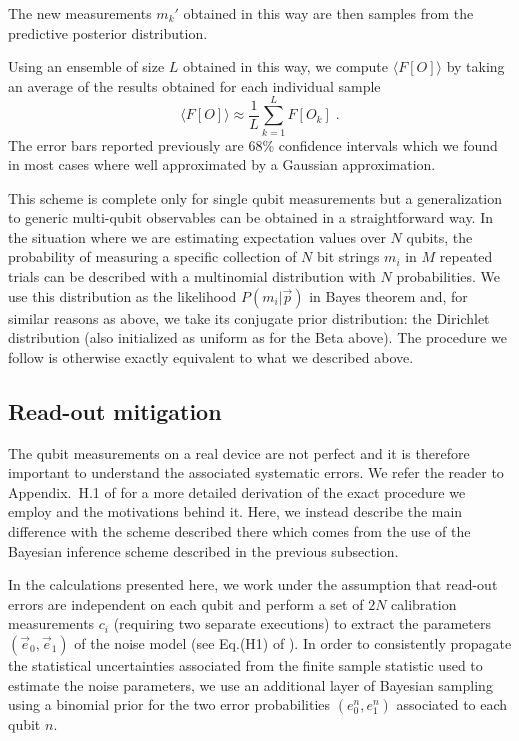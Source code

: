 \documentclass[Dual]{msu-thesis}
\begin{document}
The new measurements $m_k'$ obtained in this way are then samples from the predictive posterior distribution.

Using an ensemble of size $L$ obtained in this way, we compute $\langle F[O]\rangle$ by taking an average of the results obtained for each individual sample
\begin{equation}
\langle F[O]\rangle \approx \frac{1}{L} \sum_{k=1}^L F[O_k]\;.
\end{equation}
The error bars reported previously are $68\%$ confidence intervals which we found in most cases where well approximated by a Gaussian approximation.

This scheme is complete only for single qubit measurements but a generalization to generic multi-qubit observables can be obtained in a straightforward way. In the situation where we are estimating expectation values over $N$ qubits, the probability of measuring  a specific collection of $N$ bit strings $m_i$ in $M$ repeated trials can be described with a multinomial distribution with $N$ probabilities. We use this distribution as the likelihood $P(m_i|\vec{p})$ in Bayes theorem and, for similar reasons as above, we take its conjugate prior distribution: the Dirichlet distribution (also initialized as uniform as for the Beta above). The procedure we follow is otherwise exactly equivalent to what we described above.

\subsection{Read-out mitigation}
The qubit measurements on a real device are not perfect and it is therefore important to understand the associated systematic errors. We refer the reader to Appendix.~H.1 of \cite{Roggero_nptodg} for a more detailed derivation of the exact procedure we employ and the motivations behind it. Here, we instead describe the main difference with the scheme described there which comes from the use of the Bayesian inference scheme described in the previous subsection.

In the calculations presented here, we work under the assumption that read-out errors are independent on each qubit and perform a set of $2N$ calibration measurements $c_i$ (requiring two separate executions) to extract the parameters $(\vec{e}_0,\vec{e}_1)$ of the noise model (see Eq.(H1) of \cite{Roggero_nptodg}). In order to consistently propagate the statistical uncertainties associated from the finite sample statistic used to estimate the noise parameters, we use an additional layer of Bayesian sampling using a binomial prior for the two error probabilities $(e^n_0,e^n_1)$ associated to each qubit $n$. 
\end{document}
